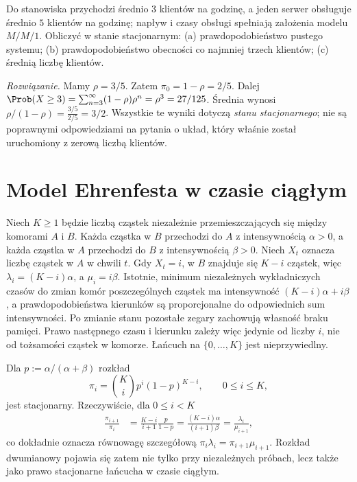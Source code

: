 \begin{zadanie}
Do stanowiska przychodzi średnio $3$ klientów na godzinę,
a jeden serwer obsługuje średnio $5$ klientów na godzinę;
napływ i czasy obsługi spełniają założenia modelu $M/M/1$.
Obliczyć w stanie stacjonarnym: (a) prawdopodobieństwo
pustego systemu; (b) prawdopodobieństwo obecności co
najmniej trzech klientów; (c) średnią liczbę klientów.

\emph{Rozwiązanie.} Mamy $\rho=3/5$. Zatem
$\pi_0=1-\rho=2/5$.
Dalej
$\Prob(X\ge3)=\sum_{n=3}^\infty(1-\rho)\rho^n
=\rho^3=27/125$.
Średnia wynosi $\rho/(1-\rho)=\frac{3/5}{2/5}=3/2$.
Wszystkie te wyniki dotyczą \emph{stanu stacjonarnego};
nie są poprawnymi odpowiedziami na pytania o układ,
który właśnie został uruchomiony z zerową liczbą klientów.
\end{zadanie}

\section{Model Ehrenfesta w czasie ciągłym}
\begin{przyklad}
Niech $K\ge1$ będzie liczbą cząstek niezależnie
przemieszczających się
między komorami $A$ i $B$. Każda cząstka w $B$ przechodzi
do $A$ z intensywnością $\alpha>0$, a każda cząstka w $A$
przechodzi do $B$ z intensywnością $\beta>0$.
Niech $X_t$ oznacza liczbę cząstek w $A$ w chwili $t$.
Gdy $X_t=i$, w $B$ znajduje się $K-i$ cząstek, więc
$\lambda_i=(K-i)\alpha$, a $\mu_i=i\beta$.
Istotnie, minimum niezależnych wykładniczych czasów
do zmian komór poszczególnych cząstek ma intensywność
$(K-i)\alpha+i\beta$, a prawdopodobieństwa kierunków
są proporcjonalne do odpowiednich sum intensywności.
Po zmianie stanu pozostałe zegary zachowują
własność braku pamięci. Prawo następnego czasu
i kierunku zależy więc jedynie od liczby $i$,
nie od tożsamości cząstek w komorze.
Łańcuch na $\{0,\ldots,K\}$ jest nieprzywiedlny.

Dla $p:=\alpha/(\alpha+\beta)$ rozkład
\[
\pi_i=\binom Ki p^i(1-p)^{K-i},\qquad 0\le i\le K,
\]
jest stacjonarny. Rzeczywiście, dla $0\le i<K$
\begin{align*}
\frac{\pi_{i+1}}{\pi_i}
&=\frac{K-i}{i+1}\frac{p}{1-p}
=\frac{(K-i)\alpha}{(i+1)\beta}
=\frac{\lambda_i}{\mu_{i+1}},
\end{align*}
co dokładnie oznacza równowagę szczegółową
$\pi_i\lambda_i=\pi_{i+1}\mu_{i+1}$.
Rozkład dwumianowy pojawia się zatem nie tylko
przy niezależnych próbach, lecz także jako prawo
stacjonarne łańcucha w czasie ciągłym.
\end{przyklad}

